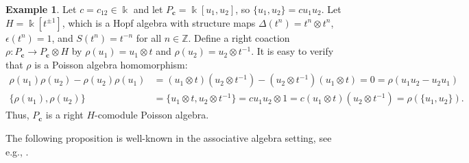 \documentclass[reqno]{amsart}
\numberwithin{equation}{section}
\theoremstyle{definition}
\newtheorem{example}[theorem]{Example}
\newcommand\inv{^{-1}}
\newcommand\tensor{\otimes}
\newcommand\kk{\Bbbk}
\newcommand\ZZ{\mathbb Z}
\newcommand\bc{\mathbf c}
\newcommand\PC{P_\bc}
\begin{document}
\begin{example}\label{ex.coaction}
Let $c=c_{12} \in \kk$ and let $\PC=\kk[u_1,u_2]$, so $\{u_1,u_2\}=cu_1u_2$. Let $H=\kk[t^{\pm 1}]$, which is a Hopf algebra with structure maps $\Delta(t^n) = t^n \tensor t^n$, $\epsilon(t^n) = 1$, and $S(t^n) = t^{-n}$ for all $n \in \ZZ$. Define a right coaction $\rho:\PC \to \PC \tensor H$ by $\rho(u_1) = u_1 \tensor t$ and $\rho(u_2) = u_2 \tensor t\inv$. It is easy to verify that $\rho$ is a Poisson algebra homomorphism:
\begin{align*}
\rho(u_1)\rho(u_2)-\rho(u_2)\rho(u_1) 
    &= (u_1 \tensor t)(u_2 \tensor t\inv) - (u_2\tensor t\inv)(u_1\tensor t)
    = 0 
    = \rho(u_1u_2-u_2u_1) \\
\{ \rho(u_1),\rho(u_2)\} 
    &= \{ u_1 \tensor t, u_2 \tensor t\inv\} 
    = c u_1u_2 \tensor 1 
    = c(u_1 \tensor t)(u_2 \tensor t\inv) 
    = \rho(\{u_1,u_2\}).
\end{align*}
Thus, $\PC$ is a right $H$-comodule Poisson algebra.
\end{example}

The following proposition is well-known in the associative algebra setting, see e.g., \cite[Proposition 6.2.4]{DNR}.
\end{document}
